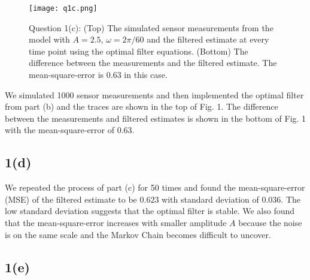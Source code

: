 \documentclass[a4paper, 11pt]{article}
\begin{document}
\begin{figure}
	\begin{center}
		\texttt{[image: q1c.png]}
		\caption{Question 1(c): (Top) The simulated sensor measurements from the model with $A = 2.5$, $\omega = 2\pi/60$ and the filtered estimate at every time point using the optimal filter equations. (Bottom) The difference between the measurements and the filtered estimate. The mean-square-error is $0.63$ in this case. }
	\end{center}
	\label{fig:q1c}
\end{figure}

We simulated 1000 sensor measurements and then implemented the optimal filter from part (b) and the traces are shown in the top of Fig. 1. The difference between the measurements and filtered estimates is shown in the bottom of Fig. 1 with the mean-square-error of $0.63$.  



\subsection*{1(d)}

We repeated the process of part (c) for 50 times and found the mean-square-error (MSE) of the filtered estimate to be $0.623$ with standard deviation of $0.036$. The low standard deviation suggests that the optimal filter is stable. We also found that the mean-square-error increases with smaller amplitude $A$ because the noise is on the same scale and the Markov Chain becomes difficult to uncover.  



\subsection*{1(e)}
\end{document}
